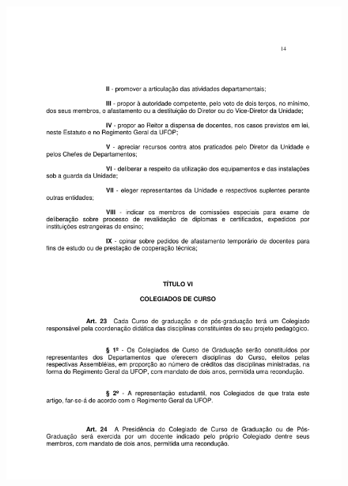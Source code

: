 \begin{figure}[p]
	\centering 
	\includegraphics[scale=0.7]{capitulos/resolucoes/cuni414/cuni414-14.pdf}
\end{figure}

